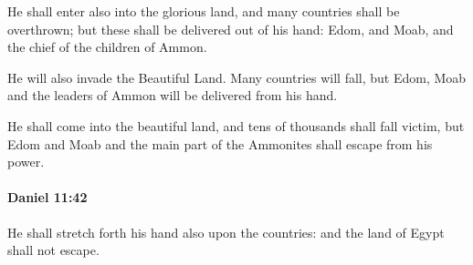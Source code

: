 			\begin{versebox}
					\item[BHS] 
					\item[LXX] 
					\item[ASV] He shall enter also into the glorious land, and many countries shall be overthrown; but these shall be delivered out of his hand: Edom, and Moab, and the chief of the children of Ammon.
					\item[NIV] He will also invade the Beautiful Land. Many countries will fall, but Edom, Moab and the leaders of Ammon will be delivered from his hand.
					\item[NRSV] He shall come into the beautiful land, and tens of thousands shall fall victim, but Edom and Moab and the main part of the Ammonites shall escape from his power.
			\end{versebox}

		\paragraph{Daniel 11:42} %
			\label{DANIEL-11-42}

			He shall stretch forth his hand also upon the countries: and the land of Egypt shall not escape.

